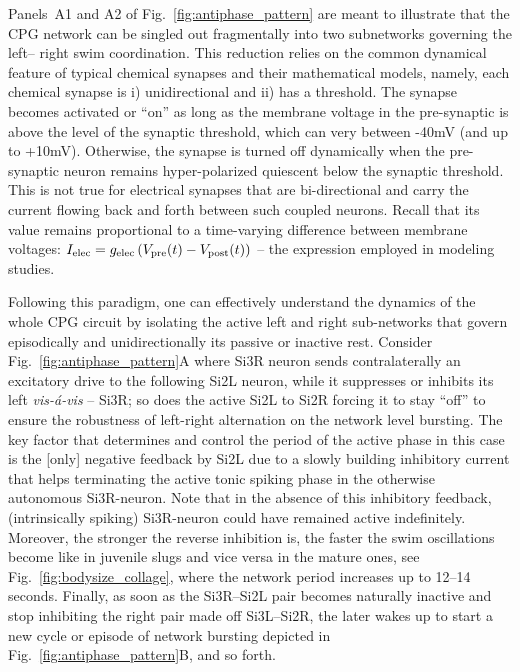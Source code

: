 \documentclass[nofootinbib,aip,amsmath,amssymb,reprint,twocolumn,10pt]{revtex4-2}
\begin{document}
Panels~A1 and A2 of Fig.~\ref{fig:antiphase_pattern} are meant to illustrate that the CPG network can be singled out fragmentally into two subnetworks governing the left-- right swim coordination. This reduction relies on the common dynamical feature of typical chemical synapses and their mathematical models, namely, each chemical synapse is i) unidirectional and ii) has a threshold. The synapse becomes activated or ``on'' as long as the membrane voltage in the pre-synaptic is above the level of the synaptic threshold, which can very between -40mV (and up to +10mV). Otherwise, the synapse is turned off dynamically when the pre-synaptic neuron remains hyper-polarized quiescent below the synaptic threshold. This is not true for electrical synapses that are bi-directional and carry the current flowing back and forth between such coupled neurons. Recall that its value remains proportional to a time-varying difference between membrane voltages: $I_{\rm elec}=g_{\rm elec}\, (V_{\rm pre}(t)-V_{\rm post}(t))$ -- the expression employed in modeling studies.      

Following this paradigm, one can effectively understand the dynamics of the whole CPG circuit by isolating the active left and right sub-networks that govern episodically and unidirectionally its passive or inactive rest. Consider  Fig.~\ref{fig:antiphase_pattern}A where Si3R neuron sends contralaterally  
an excitatory drive to the following  Si2L neuron, while it suppresses or inhibits its left  {\em vis-\'a-vis} -- Si3R; so does the active Si2L to Si2R forcing it to stay ``off'' to ensure the robustness of left-right alternation on the network level bursting. The key factor that determines and control the period of the active phase in this case is the [only] negative feedback by Si2L due to a slowly building inhibitory current that helps terminating the active tonic spiking phase in the otherwise autonomous Si3R-neuron. Note that in the absence of this inhibitory feedback, (intrinsically spiking) Si3R-neuron could have remained active indefinitely. Moreover, the stronger the reverse inhibition is, the faster the swim oscillations become like in juvenile slugs  and vice versa in the mature ones, see Fig.~\ref{fig:bodysize_collage}, where the network period increases up to 12--14 seconds. Finally, as soon as the Si3R--Si2L pair becomes naturally inactive and stop inhibiting the right pair made off Si3L--Si2R, the later wakes up to start a new cycle or episode of network bursting depicted in Fig.~\ref{fig:antiphase_pattern}B, and so forth.            
\end{document}
